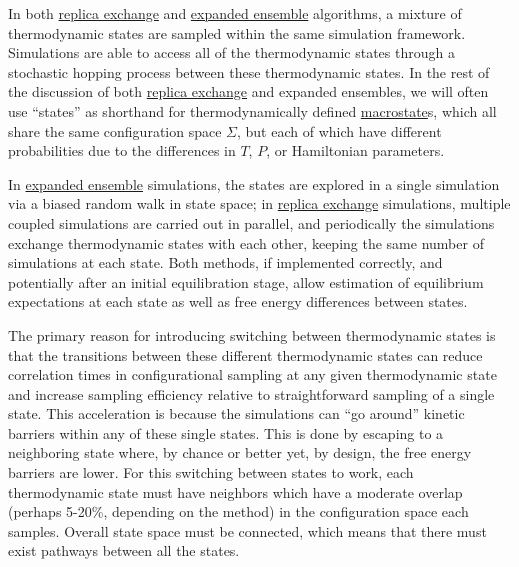 \documentclass[9pt,review]{livecoms}
\begin{document}
In both \hyperlink{ref:ReplEx} {replica exchange} and \hyperlink{ref:ExpEns} {expanded ensemble} algorithms, a mixture of thermodynamic states are sampled within the same simulation framework. Simulations are able to access all of the  thermodynamic states through a stochastic hopping process between these thermodynamic states.  In the rest of the discussion of both \hyperlink{ref:ReplEx} {replica exchange} and expanded ensembles, we will often use ``states'' as shorthand for thermodynamically defined \hyperlink{ref:Macrostate} {macrostate}s, which all share the same configuration space $\Sigma$, but each of which have different probabilities due to the differences in $T$, $P$, or Hamiltonian parameters.

In \hyperlink{ref:ExpEns} {expanded ensemble} simulations, the states are explored in a single simulation via a biased random walk in state space; in \hyperlink{ref:ReplEx} {replica exchange} simulations, multiple coupled simulations are carried out in parallel, and periodically the simulations exchange thermodynamic states with each other, keeping the same number of simulations at each state. Both methods, if implemented correctly, and potentially after an initial equilibration stage, allow estimation of equilibrium expectations at each state as well as free energy differences between states.

The primary reason for introducing switching between thermodynamic states is that the transitions between these different thermodynamic states can reduce correlation times in configurational sampling at any given thermodynamic state and increase sampling efficiency relative to straightforward sampling of a single state. This acceleration is because the simulations can ``go around''  kinetic barriers within any of these single states. This is done by escaping to a neighboring state where, by chance or better yet, by design, the free energy barriers are lower.  For this switching between states to work, each thermodynamic state must have neighbors which have a moderate overlap (perhaps 5-20\%, depending on the method) in the configuration space each samples. Overall state space must be connected, which means that there must exist pathways between all the states.
\end{document}
